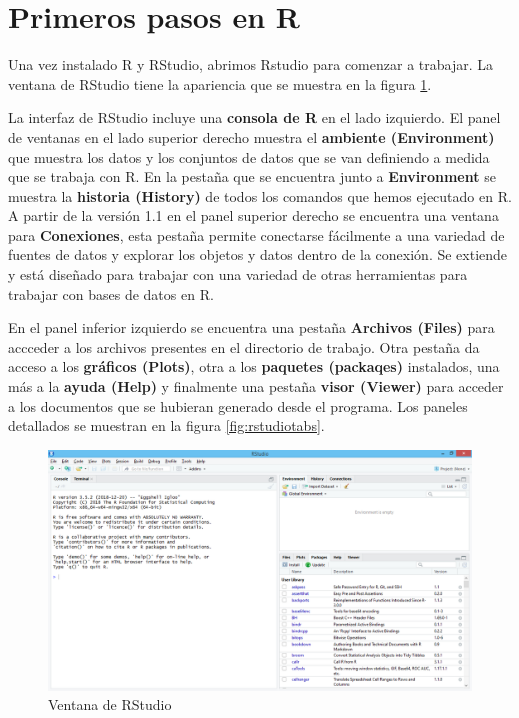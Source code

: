 \documentclass[letterpaper,]{book}
\begin{document}
\hypertarget{primerR}{%
\section{Primeros pasos en R}\label{primerR}}

Una vez instalado R y RStudio, abrimos Rstudio para comenzar a trabajar. La ventana de RStudio tiene la apariencia que se muestra en la figura \ref{fig:rstudio1}.

La interfaz de RStudio incluye una \textbf{consola de R} en el lado izquierdo. El panel de ventanas en el lado superior derecho muestra el \textbf{ambiente (Environment)} que muestra los datos y los conjuntos de datos que se van definiendo a medida que se trabaja con R. En la pestaña que se encuentra junto a \textbf{Environment} se muestra la \textbf{historia (History)} de todos los comandos que hemos ejecutado en R. A partir de la versión 1.1 en el panel superior derecho se encuentra una ventana para \textbf{Conexiones}, esta pestaña permite conectarse fácilmente a una variedad de fuentes de datos y explorar los objetos y datos dentro de la conexión. Se extiende y está diseñado para trabajar con una variedad de otras herramientas para trabajar con bases de datos en R.

En el panel inferior izquierdo se encuentra una pestaña \textbf{Archivos (Files)} para accceder a los archivos presentes en el directorio de trabajo. Otra pestaña da acceso a los \textbf{gráficos (Plots)}, otra a los \textbf{paquetes (packaqes)} instalados, una más a la \textbf{ayuda (Help)} y finalmente una pestaña \textbf{visor (Viewer)} para acceder a los documentos que se hubieran generado desde el programa. Los paneles detallados se muestran en la figura \ref{fig:rstudiotabs}.

\begin{figure}[h!]

{\centering \includegraphics[width=0.5\linewidth]{rstudio1} 

}

\caption{Ventana de RStudio}\label{fig:rstudio1}
\end{figure}
\end{document}

